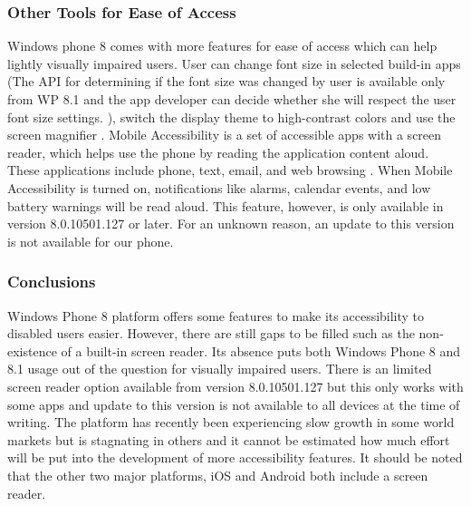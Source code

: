 \subsubsection{Other Tools for Ease of Access}
Windows phone 8 comes with more features for ease of access which can help lightly visually impaired users. User can change font size in selected build-in apps (The API for determining if the font size was changed by user is available only from WP 8.1 and the app developer can decide whether she will respect the user font size settings. \cite{wp8accText}), switch the display theme to high-contrast colors and use the screen magnifier \cite{wp8screenreader}. Mobile Accessibility is a set of accessible apps with a screen reader, which helps use the phone by reading the application content aloud. These applications include phone, text, email, and web browsing \cite{wp8screenreader}. When Mobile Accessibility is turned on, notifications like alarms, calendar events, and low battery warnings will be read aloud. This feature, however, is only available in version 8.0.10501.127 \cite{wp8screenreader} or later. For an unknown reason, an update to this version is not available for our phone.

\subsubsection{Conclusions}
Windows Phone 8 platform offers some features to make its accessibility to disabled users easier. However, there are still gaps to be filled such as the non-existence of a built-in screen reader. Its absence puts both Windows Phone 8 and 8.1 usage out of the question for visually impaired users. There is an limited screen reader option available from version 8.0.10501.127 \cite{wp8screenreader} but this only works with some apps and update to this version is not available to all devices at the time of writing. The platform has recently been experiencing slow growth in some world markets but is stagnating in others \cite{phone8market} and it cannot be estimated how much effort will be put into the development of more accessibility features. It should be noted that the other two major platforms, iOS and Android both include a screen reader.
